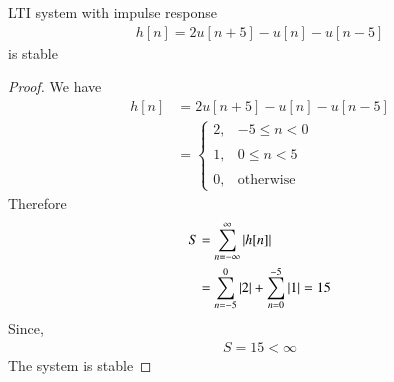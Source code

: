 \documentclass[journal,12pt,twocolumn]{IEEEtran}
\begin{document}
\begin{lemma}
LTI system with impulse response 
\begin{align}
   h[n] = 2u[n+5] - u[n] - u[n-5]
\end{align}
is stable
\end{lemma}
\begin{proof}
We have
\begin{align}
    h[n] &= 2u[n+5] - u[n] - u[n-5]\\
         &= \begin{cases}
         2, & -5 \leq n < 0 \\~\\[-1em]
	     1, & 0 \leq n < 5 \\~\\[-1em]
	     0, & \text{otherwise}
         \end{cases}
\end{align}
Therefore
\begin{align}
    S &= \sum_{n=-\infty}^{\infty}\vert h[n]\vert\\ 
    &=  \sum_{n=-5}^{0}\vert2\vert+ \sum_{n=0}^{-5}\vert1\vert
    = 15
\end{align}
Since,
\begin{align}
    S = 15 < \infty
\end{align}
The system is stable
\end{proof}
\end{document}
